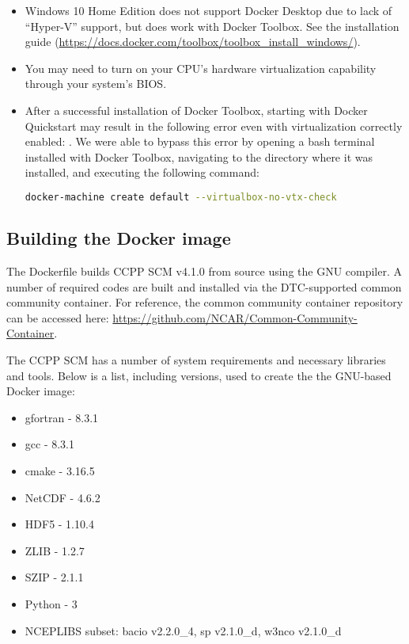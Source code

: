 \begin{itemize}
\item Windows 10 Home Edition does not support Docker Desktop due to lack of ``Hyper-V'' support, but does work with Docker Toolbox. See the installation guide (\url{https://docs.docker.com/toolbox/toolbox_install_windows/}).
\item You may need to turn on your CPU's hardware virtualization capability through your system's BIOS.
\item After a successful installation of Docker Toolbox, starting with Docker Quickstart may result in the following error even with virtualization correctly enabled: . We were able to bypass this error by opening a bash terminal installed with Docker Toolbox, navigating to the directory where it was installed, and executing the following command:
\begin{lstlisting}[language=bash]
docker-machine create default --virtualbox-no-vtx-check
\end{lstlisting}
\end{itemize}

\subsection{Building the Docker image}

The Dockerfile builds CCPP SCM v4.1.0 from source using the GNU compiler. A number of required codes are built and installed via the DTC-supported common community container. For reference, the common community container repository can be accessed here: \url{https://github.com/NCAR/Common-Community-Container}.

The CCPP SCM has a number of system requirements and necessary libraries and tools. Below is a list, including versions, used to create the the GNU-based Docker image:
\begin{itemize}
\item gfortran - 8.3.1
\item gcc - 8.3.1
\item cmake - 3.16.5
\item NetCDF - 4.6.2
\item HDF5 - 1.10.4
\item ZLIB - 1.2.7
\item SZIP - 2.1.1
\item Python - 3
\item NCEPLIBS subset: bacio v2.2.0\_4, sp v2.1.0\_d, w3nco v2.1.0\_d
\end{itemize}

